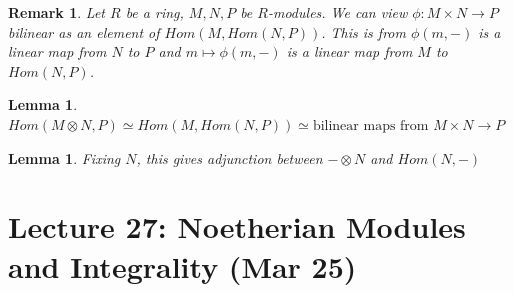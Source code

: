 \documentclass[a4paper,12pt]{article}
\newtheorem{lem}[thm]{Lemma}
\newtheorem{rmk}[thm]{Remark}
\begin{document}
\begin{rmk}
    Let $R$ be a ring, $M,N,P$ be $R$-modules. We can view $\phi:M\times N\to P$ bilinear as an element of $Hom(M,Hom(N,P))$. This is from $\phi(m,-)$ is a linear map from $N$ to $P$ and $m\mapsto \phi(m,-)$ is a linear map from $M$ to $Hom(N,P)$. 
\end{rmk}
\begin{lem}
    $Hom(M\otimes N, P)\simeq Hom(M,Hom(N,P))\simeq \text{bilinear maps from } M\times N \to P$
\end{lem}
\begin{lem}
    Fixing $N$, this gives adjunction between $-\otimes N$ and $Hom(N,-)$
\end{lem}
\newpage
\section{Lecture 27: Noetherian Modules and Integrality (Mar 25)}
\end{document}
